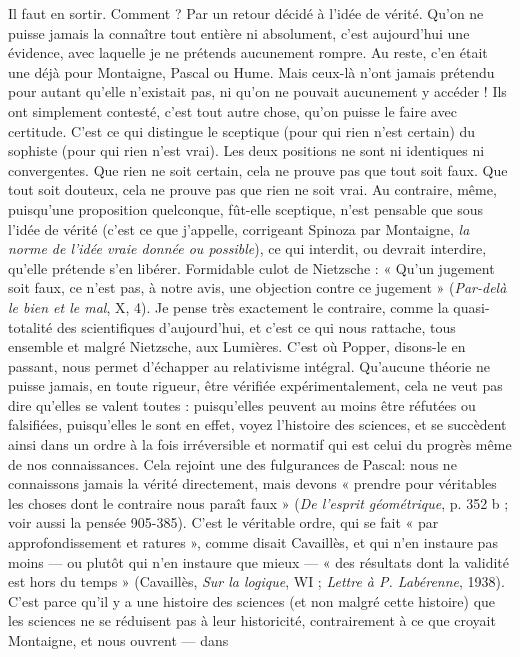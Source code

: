 Il faut en sortir. Comment ? Par un retour décidé à l’idée de vérité. Qu’on
ne puisse jamais la connaître tout entière ni absolument, c’est aujourd’hui une
évidence, avec laquelle je ne prétends aucunement rompre. Au reste, c’en était
une déjà pour Montaigne, Pascal ou Hume. Mais ceux-là n’ont jamais prétendu
pour autant qu’elle n’existait pas, ni qu’on ne pouvait aucunement y
accéder ! Ils ont simplement contesté, c’est tout autre chose, qu’on puisse le
faire avec certitude. C’est ce qui distingue le sceptique (pour qui rien n’est certain)
du sophiste (pour qui rien n’est vrai). Les deux positions ne sont ni identiques
ni convergentes. Que rien ne soit certain, cela ne prouve pas que tout
soit faux. Que tout soit douteux, cela ne prouve pas que rien ne soit vrai. Au
contraire, même, puisqu’une proposition quelconque, fût-elle sceptique, n’est
pensable que sous l’idée de vérité (c’est ce que j'appelle, corrigeant Spinoza par
Montaigne, {\it la norme de l'idée vraie donnée ou possible}), ce qui interdit, ou
devrait interdire, qu’elle prétende s’en libérer. Formidable culot de Nietzsche :
« Qu'un jugement soit faux, ce n’est pas, à notre avis, une objection contre ce
jugement » ({\it Par-delà le bien et le mal}, X, 4). Je pense très exactement le
contraire, comme la quasi-totalité des scientifiques d’aujourd’hui, et c’est ce
qui nous rattache, tous ensemble et malgré Nietzsche, aux Lumières. C’est où
Popper, disons-le en passant, nous permet d'échapper au relativisme intégral.
Qu’aucune théorie ne puisse jamais, en toute rigueur, être vérifiée expérimentalement,
cela ne veut pas dire qu’elles se valent toutes : puisqu'elles peuvent au
moins être réfutées ou falsifiées, puisqu'elles le sont en effet, voyez l’histoire des
sciences, et se succèdent ainsi dans un ordre à la fois irréversible et normatif qui
est celui du progrès même de nos connaissances. Cela rejoint une des fulgurances
de Pascal: nous ne connaissons jamais la vérité directement, mais
devons « prendre pour véritables les choses dont le contraire nous paraît faux »
({\it De l'esprit géométrique}, p. 352 b ; voir aussi la pensée 905-385). C’est le véritable
ordre, qui se fait « par approfondissement et ratures », comme disait
Cavaillès, et qui n’en instaure pas moins — ou plutôt qui n’en instaure que
mieux — « des résultats dont la validité est hors du temps » (Cavaillès, {\it Sur la
logique}, WI ; {\it Lettre à P. Labérenne}, 1938). C’est parce qu’il y a une histoire des
sciences (et non malgré cette histoire) que les sciences ne se réduisent pas à leur
historicité, contrairement à ce que croyait Montaigne, et nous ouvrent — dans
